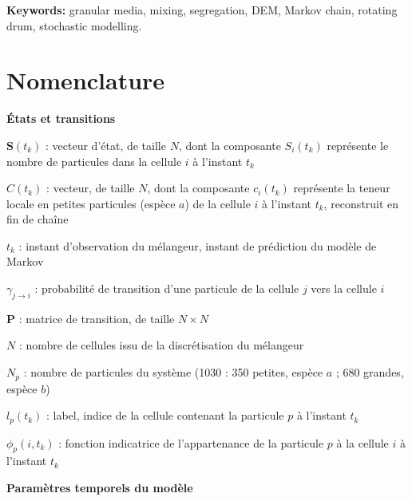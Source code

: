 \documentclass[french]{MemoireMaster}
\begin{document}
\vspace{0.5cm}
\noindent
\textbf{Keywords:} granular media, mixing, segregation, DEM, Markov chain, rotating drum, stochastic modelling.

\clearpage


\tabledematieres
\listefiguresdoc
\listetableauxdoc

\cleardoublepage
\pagestyle{fancy}
\setcounter{page}{1}

\section{Nomenclature}

\noindent\textbf{États et transitions}

$\mathbf{S}(t_k)$ : vecteur d'état, de taille $N$, dont la composante $S_i(t_k)$ représente le nombre de particules dans la cellule $i$ à l'instant $t_k$

$C(t_k)$ : vecteur, de taille $N$, dont la composante $c_i(t_k)$ représente la teneur locale en petites particules (espèce $a$) de la cellule $i$ à l'instant $t_k$, reconstruit en fin de chaîne

$t_k$ : instant d'observation du mélangeur, instant de prédiction du modèle de Markov

$\gamma_{j \to i}$ : probabilité de transition d'une particule de la cellule $j$ vers la cellule $i$

$\mathbf{P}$ : matrice de transition, de taille $N \times N$

$N$ : nombre de cellules issu de la discrétisation du mélangeur

$N_p$ : nombre de particules du système (1030 : 350 petites, espèce $a$ ; 680 grandes, espèce $b$)

$l_p(t_k)$ : label, indice de la cellule contenant la particule $p$ à l'instant $t_k$

$\phi_p(i,t_k)$ : fonction indicatrice de l'appartenance de la particule $p$ à la cellule $i$ à l'instant $t_k$

\noindent\textbf{Paramètres temporels du modèle}
\end{document}
